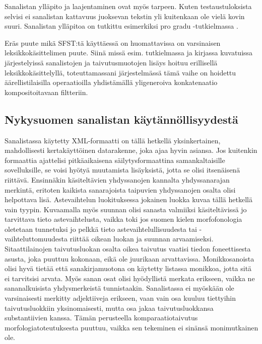 \documentclass[free]{flammie}
\begin{document}
Sanalistan ylläpito ja laajentaminen ovat myös tarpeen. Kuten testaustuloksista
selvisi ei sanalistan kattavuus juoksevan tekstin yli kuitenkaan ole vielä kovin
suuri. Sanalistan ylläpitoa on tutkittu esimerkiksi pro gradu -tutkielmassa
\cite{seppala2006}.

Eräs puute mikä SFST:tä käyttäessä on huomattavissa on varsinaisen leksikkokäsittelimen puute. Siinä missä esim. tutkielmassa \cite{koskenniemi1983twolevel} ja kirjassa
\cite{beesley2004finite} kuvatuissa järjestelyissä sanalistojen ja taivutusmuotojen lisäys hoituu erillisellä leksikkokäsittelyllä, toteuttamassani järjestelmässä
tämä vaihe on hoidettu äärellistilaisilla operaatioilla yhdistämällä yligeneroiva
konkatenaatio kompositoitavaan filtteriin.

\subsection{Nykysuomen sanalistan käytännöllisyydestä}

Sanalistassa käytetty XML-formaatti on tällä hetkellä yksinkertainen, mahdollisesti kertakäyttöinen datarakenne, joka ajaa hyvin asiansa. Jos kuitenkin formaattia ajattelisi pitkäaikaisena säilytysformaattina samankaltaisille sovelluksille, se
voisi hyötyä muutamista lisäyksistä, jotta se olisi itsenäisenä riittävä. Ensinnäkin käsiteltävien yhdyssanojen kannalta yhdyssanarajan merkintä, eritoten kaikista sanarajoista taipuvien yhdyssanojen osalta olisi helpottava lisä. Astevaihtelun luokituksessa jokainen luokka kuvaa tällä hetkellä vain tyypin. Kuvaamalla
myös suunnan olisi sanasta valmiiksi käsiteltävissä jo tarvittava tieto astevaihtelusta, vaikka toki jos suomen kielen morfofonologia oletetaan tunnetuksi jo pelkkä tieto astevaihtelullisuudesta tai -vaihteluttomuudesta riittää oikean luokan ja
suunnan arvaamiseksi. Sitaattilainojen taivutusluokan osalta oikea taivutus vaatisi tiedon foneettisesta asusta, joka puuttuu kokonaan, eikä ole juurikaan arvattavissa. Monikkosanoista olisi hyvä tietää että sanakirjamuotona on käytetty listassa monikkoa, jotta sitä ei tarvitsisi arvata. Myös sanan osat olisi hyödyllistä
merkata erikseen, vaikka ne sananalkuisista yhdysmerkeistä tunnistaakin. Sanalistassa ei myöskään ole varsinaisesti merkitty adjektiiveja erikseen, vaan vain osa
kuuluu tiettyihin taivutusluokkiin yksinomaisesti, mutta osa jakaa taivutusluokkansa substantiivien kanssa. Tämän perusteella komparaatiotaivutus morfologiatoteutuksesta puuttuu, vaikka sen tekeminen ei sinänsä monimutkainen ole.
\end{document}
